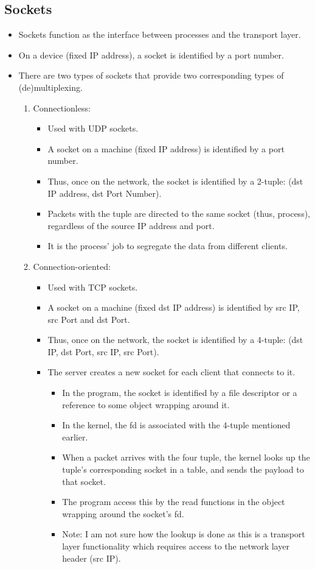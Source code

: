 \documentclass{report}
\begin{document}
\subsection{Sockets}
\begin{itemize}
\item Sockets function as the interface between processes and the transport layer.
\item On a device (fixed IP address), a socket is identified by a port number.
\item There are two types of sockets that provide two corresponding types of (de)multiplexing.
\begin{enumerate}
\item Connectionless:
\begin{itemize}
    \item Used with UDP sockets.
    \item A socket on a machine (fixed IP address) is identified by a port number.
    \item Thus, once on the network, the socket is identified by a 2-tuple: (dst IP address, dst Port Number).
    \item Packets with the tuple are directed to the same socket (thus, process),
    regardless of the source IP address and port.
    \item It is the process' job to segregate the data from different clients.
\end{itemize}
\item Connection-oriented:
\begin{itemize}
    \item Used with TCP sockets.
    \item A socket on a machine (fixed dst IP address) is identified by src IP, src Port and dst Port.
    \item Thus, once on the network, the socket is identified  by a 4-tuple: (dst IP, dst Port, src IP, src Port).
    \item The server creates a new socket for each client that connects to it.
    \begin{itemize}
        \item In the program, the socket is identified by a file descriptor or a reference to some object wrapping around it.
        \item In the kernel, the fd is associated with the 4-tuple mentioned earlier.
        \item When a packet arrives with the four tuple, the kernel looks up the tuple's corresponding socket in a table, and sends the payload to that socket.
        \item The program access this by the read functions in the object wrapping around the socket's fd.
        \item Note: I am not sure how the lookup is done as this is a transport layer functionality which requires access to the network layer header (src IP). 
    \end{itemize}
\end{itemize}
\end{enumerate}
\end{itemize}
\end{document}
